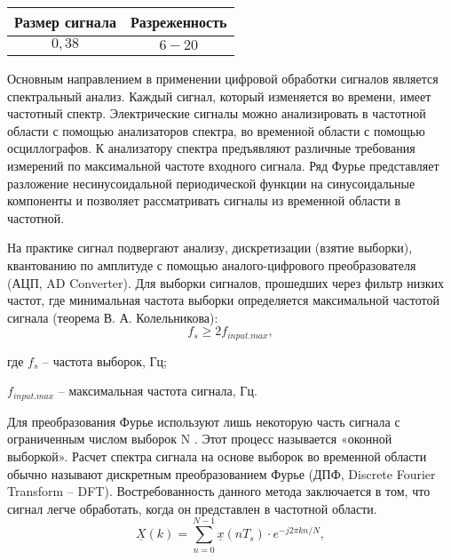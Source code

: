 \begin{table}[ht]
	\caption{Допустимые комбинации входных параметров}%
	\label{tbl:test3_1}%
	\fontsize{14pt}{14pt}\selectfont
	\begin{longtable*}[c]{|c|c|} 
		\hline
		Размер сигнала & Разреженность \\
		\hline
		$0,38$ &
		$6-20$  \\
		\hline
	\end{longtable*}
\end{table}





Основным направлением в применении цифровой обработки сигналов является спектральный анализ. Каждый сигнал, который изменяется во времени, имеет частотный спектр. Электрические сигналы можно 
анализировать в частотной области с помощью анализаторов спектра, во временной области с помощью осциллографов. К анализатору спектра предъявляют различные требования измерений по максимальной частоте входного сигнала. Ряд Фурье представляет разложение несинусоидальной периодической функции на синусоидальные компоненты и позволяет рассматривать сигналы из временной области в частотной.

На практике сигнал подвергают анализу, дискретизации (взятие выборки), квантованию по амплитуде с помощью аналого-цифрового преобразователя (АЦП, AD Converter). Для выборки сигналов, прошедших 
через фильтр низких частот, где минимальная частота выборки определяется максимальной частотой сигнала (теорема В. А. Колельникова): 
\begin{equation}
 \label{eq:equation1}
 f_s \geqslant 2f_{input.max},
\end{equation}

где $f_s$ – частота выборок, Гц;

$f_{input.max}$ – максимальная частота сигнала, Гц.

Для преобразования Фурье используют лишь некоторую часть сигнала с 
ограниченным числом выборок 
N . Этот процесс называется «оконной 
выборкой».
Расчет спектра сигнала на основе выборок во временной области обычно 
называют дискретным преобразованием Фурье (ДПФ, Discrete Fourier 
Transform – DFT). Востребованность данного метода заключается в том, что 
сигнал легче обработать, когда он представлен в частотной области.
\begin{equation}
\label{eq:equation1}
	\underline{X}(k) = \sum^{N-1}_{n=0} \underline{x}(nT_s) \cdot e^{-j2 \pi kn/N},
\end{equation}

